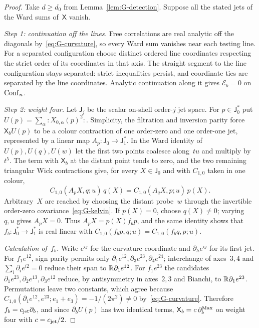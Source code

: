 \begin{proof}
Take $d\ge d_0$ from Lemma~\ref{lem:G-detection}. Suppose all the stated jets of the Ward sums of~$\mathsf X$ vanish.

\emph{Step 1: continuation off the lines.} Free correlations are real analytic off the diagonals by~\eqref{eq:G-curvature}, so every Ward sum vanishes near each testing line. For a separated configuration choose distinct ordered line coordinates respecting the strict order of its coordinates in that axis. The straight segment to the line configuration stays separated: strict inequalities persist, and coordinate ties are separated by the line coordinates. Analytic continuation along it gives $\mathcal E_b=0$ on~$\mathrm{Conf}_{n}$.

\emph{Step 2: weight four.} Let $\mathsf J_j$ be the scalar on-shell order-$j$ jet space. For $p\in\mathsf J_0^*$ put $U(p)=\sum_\alpha{:}X_{0,\alpha}(p)^2{:}$. Simplicity, the filtration and inversion parity force $\mathsf X_bU(p)$ to be a colour contraction of one order-zero and one order-one jet, represented by a linear map $A_p:\mathsf J_0\to\mathsf J_1^*$. In the Ward identity of $U(p),U(q),U(w)$ let the first two points coalesce along~$tu$ and multiply by~$t^5$. The term with $\mathsf X_b$ at the distant point tends to zero, and the two remaining triangular Wick contractions give, for every $X\in\mathsf J_0$ and with $C_{1,0}$ taken in one colour,
\begin{equation*}
C_{1,0}(A_pX,q;u)\,q(X)=C_{1,0}(A_qX,p;u)\,p(X).
\end{equation*}
Arbitrary~$X$ are reached by choosing the distant probe~$w$ through the invertible order-zero covariance~\eqref{eq:G-kelvin}. If $p(X)=0$, choose $q(X)\ne0$; varying $q,u$ gives $A_pX=0$. Thus $A_pX=p(X)f_bp$, and the same identity shows that $f_b:\mathsf J_0^*\to\mathsf J_1^*$ is real linear with $C_{1,0}(f_bp,q;u)=C_{1,0}(f_bq,p;u)$.

\emph{Calculation of~$f_b$.} Write $e^{ij}$ for the curvature coordinate and $\partial_he^{ij}$ for its first jet. For $f_1e^{12}$, sign parity permits only $\partial_1e^{12},\partial_3e^{23},\partial_4e^{24}$; interchange of axes~$3,4$ and $\sum_i\partial_ie^{i2}=0$ reduce their span to $\mathbb{R}\partial_1e^{12}$. For $f_1e^{23}$ the candidates $\partial_1e^{23},\partial_2e^{13},\partial_3e^{12}$ reduce, by antisymmetry in axes~$2,3$ and Bianchi, to $\mathbb{R}\partial_1e^{23}$. Permutations leave two constants, which agree because $C_{1,0}(\partial_1e^{12},e^{23};e_1+e_3)=-1/(2\pi^2)\ne0$ by~\eqref{eq:G-curvature}. Therefore $f_b=c_{\rm jet}\partial_b$, and since $\partial_bU(p)$ has two identical terms, $\mathsf X_b=c\,\partial^{\rm Max}_b$ on weight four with $c=c_{\rm jet}/2$.


\end{proof}
